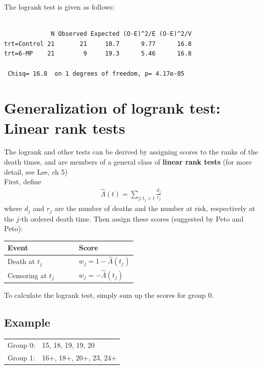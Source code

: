 \documentclass[11pt,slidesonly,semrot,portrait,palatino]{book}
\begin{document}
{The logrank test is given as follows:
\begin{verbatim}

             N Observed Expected (O-E)^2/E (O-E)^2/V
trt=Control 21       21     10.7      9.77      16.8
trt=6-MP    21        9     19.3      5.46      16.8

 Chisq= 16.8  on 1 degrees of freedom, p= 4.17e-05
\end{verbatim}
\section{Generalization of logrank test: Linear rank tests}
The logrank and other tests can be derived by assigning scores to the
ranks of the death times, and are members of a general class
of {\bf linear rank tests} (for more detail, see Lee, ch 5)
\\[2ex]
First, define
\begin{eqnarray*}
\hat\Lambda(t) = \sum_{j: t_j <t} \frac{d_j}{r_j}
\end{eqnarray*}
where $d_j$ and $r_j$ are the number of deaths and the
number at risk, respectively at the $j$-th ordered death
time.  Then assign these scores (suggested by Peto and Peto):
\begin{center}
\begin{tabular}{ll}
\hline \hline
{\sc Event} & {\sc Score} \\ \hline
Death at $t_j$ & $w_j=1 - \hat\Lambda(t_j)$\\[1ex]
Censoring at $t_j$~~~~~ & $w_j= - \hat\Lambda(t_j)$\\
\hline
\end{tabular}
\end{center}
To calculate the logrank test, simply sum up the scores for group 0.
\\[2ex]
\subsection{Example}
\begin{center}
\begin{tabular}{ll}
Group 0: & 15, 18, 19, 19, 20 \\[1ex]
Group 1: & 16$+$, 18$+$, 20$+$, 23, 24$+$
\end{tabular}


\end{center}}
\end{document}
